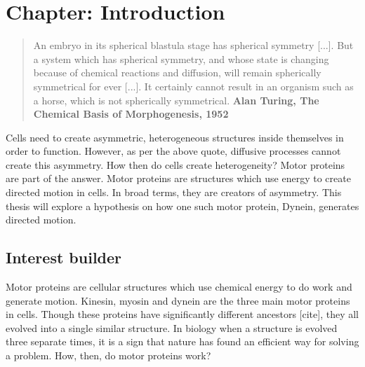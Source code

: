 \documentclass[10pt]{article} %
\begin{document}
\tableofcontents
\listoffigures
\newpage

\section{Chapter: Introduction}
\blockquote{An embryo in its spherical blastula stage has spherical symmetry [...]. But a system which has spherical symmetry, and whose state is changing because of chemical reactions and diffusion, will remain spherically symmetrical for ever [...]. It certainly cannot result in an organism such as a horse, which is not spherically symmetrical. \textbf{Alan Turing, The Chemical Basis of Morphogenesis, 1952}}

Cells need to create asymmetric, heterogeneous structures inside themselves in order to function. However, as per the above quote, diffusive processes cannot create this asymmetry. How then do cells create heterogeneity? Motor proteins are part of the answer. Motor proteins are structures which use energy to create directed motion in cells. In broad terms, they are creators of asymmetry. This thesis will explore a hypothesis on how one such motor protein, Dynein, generates directed motion.\\




\subsection{Interest builder}
Motor proteins are cellular structures which use chemical energy to do work and generate motion. Kinesin, myosin and dynein are the three main motor proteins in cells. Though these proteins have significantly different ancestors [cite], they all evolved into a single similar structure. In biology when a structure is evolved three separate times, it is a sign that nature has found an efficient way for solving a problem. How, then, do motor proteins work?\\
\end{document}

